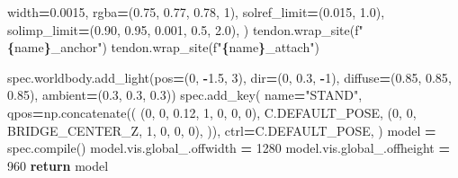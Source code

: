 \documentclass[
  american,
  11pt,
  letterpaper,
]{article}
\newenvironment{Shaded}{\begin{snugshade}}{\end{snugshade}}
\newcommand{\BuiltInTok}[1]{#1}
\newcommand{\ControlFlowTok}[1]{\textcolor[rgb]{0.13,0.29,0.53}{\textbf{#1}}}
\newcommand{\DecValTok}[1]{\textcolor[rgb]{0.00,0.00,0.81}{#1}}
\newcommand{\FloatTok}[1]{\textcolor[rgb]{0.00,0.00,0.81}{#1}}
\newcommand{\NormalTok}[1]{#1}
\newcommand{\OperatorTok}[1]{\textcolor[rgb]{0.81,0.36,0.00}{\textbf{#1}}}
\newcommand{\SpecialCharTok}[1]{\textcolor[rgb]{0.81,0.36,0.00}{\textbf{#1}}}
\newcommand{\SpecialStringTok}[1]{\textcolor[rgb]{0.31,0.60,0.02}{#1}}
\newcommand{\StringTok}[1]{\textcolor[rgb]{0.31,0.60,0.02}{#1}}
\renewenvironment{Shaded}{\par\smallskip}{\par\smallskip}
\begin{document}
\begin{Shaded}
\begin{Highlighting}[]
\NormalTok{                width}\OperatorTok{=}\FloatTok{0.0015}\NormalTok{,}
\NormalTok{                rgba}\OperatorTok{=}\NormalTok{(}\FloatTok{0.75}\NormalTok{, }\FloatTok{0.77}\NormalTok{, }\FloatTok{0.78}\NormalTok{, }\DecValTok{1}\NormalTok{),}
\NormalTok{                solref\_limit}\OperatorTok{=}\NormalTok{(}\FloatTok{0.015}\NormalTok{, }\FloatTok{1.0}\NormalTok{),}
\NormalTok{                solimp\_limit}\OperatorTok{=}\NormalTok{(}\FloatTok{0.90}\NormalTok{, }\FloatTok{0.95}\NormalTok{, }\FloatTok{0.001}\NormalTok{, }\FloatTok{0.5}\NormalTok{, }\FloatTok{2.0}\NormalTok{),}
\NormalTok{            )}
\NormalTok{            tendon.wrap\_site(}\SpecialStringTok{f"}\SpecialCharTok{\{}\NormalTok{name}\SpecialCharTok{\}}\SpecialStringTok{\_anchor"}\NormalTok{)}
\NormalTok{            tendon.wrap\_site(}\SpecialStringTok{f"}\SpecialCharTok{\{}\NormalTok{name}\SpecialCharTok{\}}\SpecialStringTok{\_attach"}\NormalTok{)}

\NormalTok{    spec.worldbody.add\_light(pos}\OperatorTok{=}\NormalTok{(}\DecValTok{0}\NormalTok{, }\OperatorTok{{-}}\FloatTok{1.5}\NormalTok{, }\DecValTok{3}\NormalTok{), }\BuiltInTok{dir}\OperatorTok{=}\NormalTok{(}\DecValTok{0}\NormalTok{, }\FloatTok{0.3}\NormalTok{, }\OperatorTok{{-}}\DecValTok{1}\NormalTok{),}
\NormalTok{                             diffuse}\OperatorTok{=}\NormalTok{(}\FloatTok{0.85}\NormalTok{, }\FloatTok{0.85}\NormalTok{, }\FloatTok{0.85}\NormalTok{), ambient}\OperatorTok{=}\NormalTok{(}\FloatTok{0.3}\NormalTok{, }\FloatTok{0.3}\NormalTok{, }\FloatTok{0.3}\NormalTok{))}
\NormalTok{    spec.add\_key(}
\NormalTok{        name}\OperatorTok{=}\StringTok{"STAND"}\NormalTok{,}
\NormalTok{        qpos}\OperatorTok{=}\NormalTok{np.concatenate((}
\NormalTok{            (}\DecValTok{0}\NormalTok{, }\DecValTok{0}\NormalTok{, }\FloatTok{0.12}\NormalTok{, }\DecValTok{1}\NormalTok{, }\DecValTok{0}\NormalTok{, }\DecValTok{0}\NormalTok{, }\DecValTok{0}\NormalTok{),}
\NormalTok{            C.DEFAULT\_POSE,}
\NormalTok{            (}\DecValTok{0}\NormalTok{, }\DecValTok{0}\NormalTok{, BRIDGE\_CENTER\_Z, }\DecValTok{1}\NormalTok{, }\DecValTok{0}\NormalTok{, }\DecValTok{0}\NormalTok{, }\DecValTok{0}\NormalTok{),}
\NormalTok{        )),}
\NormalTok{        ctrl}\OperatorTok{=}\NormalTok{C.DEFAULT\_POSE,}
\NormalTok{    )}
\NormalTok{    model }\OperatorTok{=}\NormalTok{ spec.}\BuiltInTok{compile}\NormalTok{()}
\NormalTok{    model.vis.global\_.offwidth }\OperatorTok{=} \DecValTok{1280}
\NormalTok{    model.vis.global\_.offheight }\OperatorTok{=} \DecValTok{960}
    \ControlFlowTok{return}\NormalTok{ model}



\end{Highlighting}
\end{Shaded}
\end{document}
